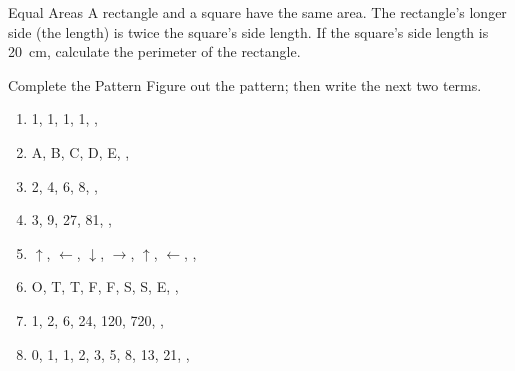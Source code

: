 \documentclass[14pt,letterpaper]{article}
\begin{document}
\begin{problem}{Equal Areas}
 A rectangle and a square have the same area. The rectangle's longer side (the
 length) is twice the square's side length. If the square's side length is
 \SI{20}{\centi\metre}, calculate the perimeter of the rectangle.
\end{problem}

\begin{problem}{Complete the Pattern}
 Figure out the pattern; then write the next two terms.

 \begin{enumerate}[\hspace{1cm}a.]
   \item 1, 1, 1, 1, , 
   \item A, B, C, D, E, , 
   \item 2, 4, 6, 8, , 
   \item 3, 9, 27, 81, , 
   \item $\uparrow$, $\leftarrow$, $\downarrow$, $\rightarrow$, $\uparrow$,
   $\leftarrow$, \SAC{\downarrow}, \SAC{\rightarrow}
   \item O, T, T, F, F, S, S, E, , 
   \item 1, 2, 6, 24, 120, 720, , 
   \item 0, 1, 1, 2, 3, 5, 8, 13, 21, , 
 \end{enumerate}
\end{problem}
\end{document}
